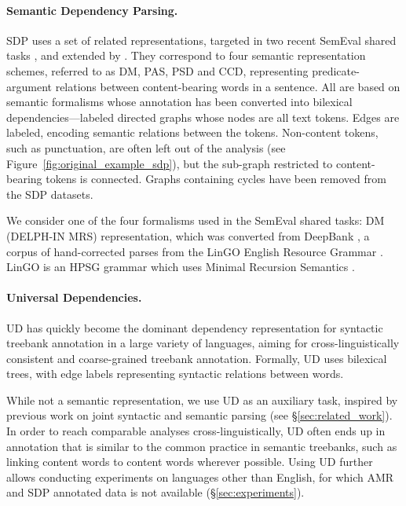 \documentclass[11pt,a4paper]{article}
\begin{document}
\paragraph{Semantic Dependency Parsing.}\label{sec:sdp}

SDP uses a set of related representations, targeted in two recent SemEval shared tasks 
\cite{oepen2014semeval,oepen2015semeval}, and extended by \citet{oepen2016towards}.
They correspond to four semantic representation schemes, referred to as
DM, PAS, PSD and CCD, representing
predicate-argument relations between content-bearing words in a sentence.
All are based on semantic formalisms whose annotation has been
converted into bilexical dependencies---labeled
directed graphs whose nodes are all text tokens.
Edges are labeled, encoding semantic relations between the tokens.
Non-content tokens, such as punctuation,
are often left out of the analysis (see Figure~\ref{fig:original_example_sdp}),
but the sub-graph restricted to content-bearing tokens is connected.
Graphs containing cycles have been removed from the SDP datasets.

We consider one of the four formalisms used
in the SemEval shared tasks: DM (DELPH-IN MRS) representation, which was converted from 
DeepBank \cite{flickinger2012deepbank}, a corpus of hand-corrected parses from the LinGO
English Resource Grammar \cite{copestake2000open}.
LinGO is an HPSG grammar \cite{pollard1994head}
which uses Minimal Recursion Semantics \cite{copestake2005minimal}.


\paragraph{Universal Dependencies.}\label{sec:ud}
UD \cite{nivre2016universal,11234/1-2515} has quickly become
the dominant dependency representation for
syntactic treebank annotation in a large variety of languages,
aiming for cross-linguistically consistent and coarse-grained treebank
annotation. Formally, UD uses bilexical trees, with edge labels 
representing syntactic relations between words.

While not a semantic representation,
we use UD as an auxiliary task,
inspired by previous work on joint syntactic and semantic parsing
(see \S\ref{sec:related_work}).
In order to reach comparable analyses cross-linguistically,
UD often ends up in annotation that is similar to the common practice
in semantic treebanks, such as linking content words to content words wherever possible.
Using UD further allows conducting experiments on languages other than English, 
for which AMR and SDP annotated data is not available (\S\ref{sec:experiments}).
\end{document}
